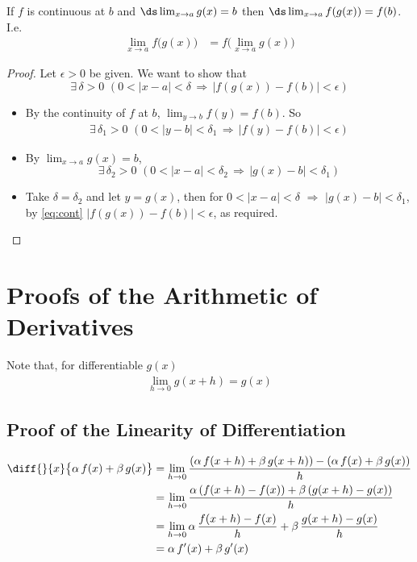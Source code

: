 \begin{theorem}
If $f$ is continuous at $b$ and $\ds \lim_{x \to a} g(x) = b$ then $\ds \lim_{x\to a} f(g(x)) = f(b)$. I.e.
\begin{align*}
\lim_{x \to a} f\big(g(x)\big) &= f\big(\lim_{x \to a} g(x)\big)
\end{align*}
\end{theorem}
\begin{proof}
Let $\epsilon > 0$ be given. We want to show that
$$\exists\,\delta > 0\,\,(0 < |x - a| < \delta\,\Longrightarrow\,|f(g(x)) - f(b)| < \epsilon)$$
\begin{itemize}
\item By the continuity of $f$ at $b$, $\lim_{y\to b}f(y) = f(b)$. So
\begin{align}\label{eq:cont}
\exists\,\delta_1 > 0\,\,(0 < |y - b| < \delta_1\,\Longrightarrow\,|f(y) - f(b)| < \epsilon)
\end{align}
\item By $\lim_{x\to a}g(x) = b$, $$\exists\,\delta_2 > 0\,\,(0 < |x - a| < \delta_2\,\Longrightarrow\,|g(x) - b| < \delta_1)$$
\item Take $\delta = \delta_2$ and let $y = g(x)$, then for $ 0 < |x - a| < \delta$ $\Longrightarrow$ $|g(x) - b| < \delta_1$, by \eqref{eq:cont} $|f(g(x)) - f(b)| < \epsilon$, as required.
\end{itemize}
\end{proof}
\section{Proofs of the Arithmetic of Derivatives}\label{sec proof arith deriv}
Note that, for differentiable $g(x)$
\begin{align*}
\lim_{h\to 0}g(x + h) = g(x)
\end{align*}
\subsection*{Proof of the Linearity of Differentiation}
\begin{align*}
\diff{}{x} \big\{\alpha\,f(x) + \beta\,g(x)\big\} &= \lim_{h\to 0}\frac{(\alpha\,f(x+h) + \beta\,g(x+h)) - (\alpha\,f(x) + \beta\,g(x))}{h} \\
&=\lim_{h\to 0}\frac{\alpha\,(f(x+h) - f(x)) + \beta\,(g(x+h)-g(x))}{h} \\
&=\lim_{h\to 0}\alpha\,\frac{f(x+h) - f(x)}{h} + \beta\,\frac{g(x+h)-g(x)}{h} \\
&= \alpha\,f'(x) + \beta\,g'(x)
\end{align*}
